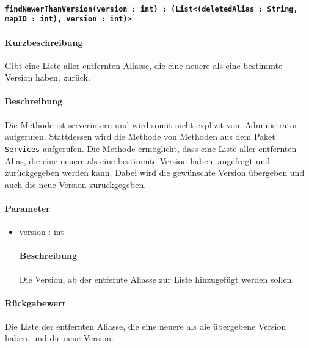 \paragraph{\texttt{findNewerThanVersion(version : int) : (List<(deletedAlias : String, mapID : int), version : int)>}}%
\paragraph*{Kurzbeschreibung}
Gibt eine Liste aller entfernten Aliasse, die eine neuere als eine bestimmte Version haben, zurück.
\paragraph*{Beschreibung}
Die Methode ist serverintern und wird somit nicht explizit vom Administrator aufgerufen.
Stattdessen wird die Methode von Methoden aus dem Paket \texttt{Services} aufgerufen.
Die Methode ermöglicht, dass eine Liste aller entfernten Alias, die eine neuere als eine bestimmte Version haben, angefragt und zurückgegeben werden kann.
Dabei wird die gewünschte Version übergeben und auch die neue Version zurückgegeben.
\paragraph*{Parameter}
\begin{itemize}
    \item version : int
    		\paragraph*{Beschreibung}
    		Die Version, ab der entfernte Aliasse zur Liste hinzugefügt werden sollen.
\end{itemize}
\paragraph*{Rückgabewert}
Die Liste der entfernten Aliasse, die eine neuere als die übergebene Version haben, und die neue Version.
